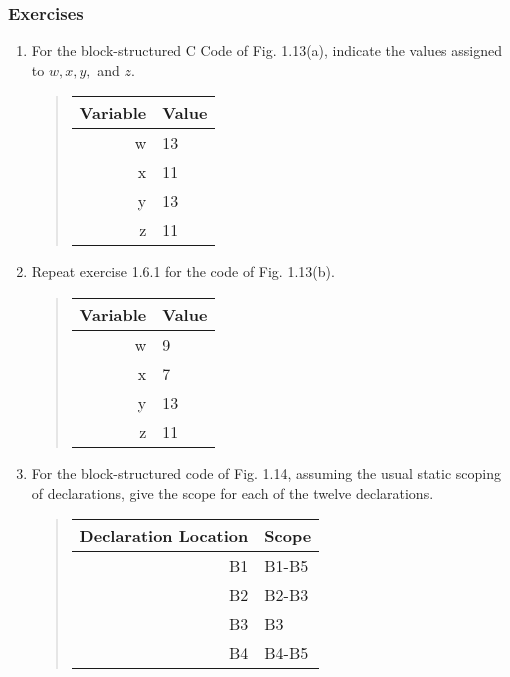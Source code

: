 \documentclass[titlepage]{article}
\begin{document}
\subsubsection*{Exercises}
\begin{enumerate}
    \item For the block-structured C Code of Fig. 1.13(a), indicate the values assigned to $w, x, y,$ and $z$.
          \begin{quote}
              \begin{tabular}{r|l}
                  Variable & Value \\ \hline
                  w        & 13    \\
                  x        & 11    \\
                  y        & 13    \\
                  z        & 11    \\
              \end{tabular}
          \end{quote}
    \item Repeat exercise 1.6.1 for the code of Fig. 1.13(b).
          \begin{quote}
              \begin{tabular}{r|l}
                  Variable & Value \\ \hline
                  w        & 9     \\
                  x        & 7     \\
                  y        & 13    \\
                  z        & 11    \\
              \end{tabular}
          \end{quote}
    \item For the block-structured code of Fig. 1.14, assuming the usual static scoping of declarations, give the scope for each of the twelve declarations.
          \begin{quote}
              \begin{tabular}{r|l}
                  Declaration Location & Scope \\ \hline
                  B1                   & B1-B5 \\
                  B2                   & B2-B3 \\
                  B3                   & B3    \\
                  B4                   & B4-B5 \\

\end{tabular}
\end{quote}
\end{enumerate}
\end{document}

